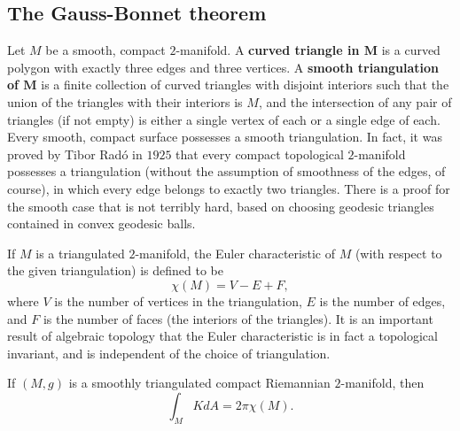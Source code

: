 \subsection{The Gauss-Bonnet theorem}
Let $M$ be a smooth, compact $2$-manifold. A \textbf{curved triangle in $\bm{M}$} is a curved polygon with exactly three edges and three vertices. A 
\textbf{smooth triangulation of $\bm{M}$} is a finite collection of curved triangles with disjoint interiors such that the union of the triangles with their interiors is 
$M$, and the intersection of any pair of triangles (if not empty) is either a single vertex of each or a single edge of each. Every smooth, compact surface possesses a 
smooth triangulation. In fact, it was proved by Tibor Rad\'o in $1925$ that every compact topological $2$-manifold possesses a triangulation (without the assumption of 
smoothness of the edges, of course), in which every edge belongs to exactly two triangles. There is a proof for the smooth case that is not terribly hard, based on 
choosing geodesic triangles contained in convex geodesic balls.\par
If $M$ is a triangulated $2$-manifold, the Euler characteristic of $M$ (with respect to the given triangulation) is defined to be 
\[\chi(M)=V-E+F,\]
where $V$ is the number of vertices in the triangulation, $E$ is the number of edges, and $F$ is the number of faces (the interiors of the triangles). It is an important 
result of algebraic topology that the Euler characteristic is in fact a topological invariant, and is independent of the choice of triangulation.
\begin{theorem}
If $(M,g)$ is a smoothly triangulated compact Riemannian $2$-manifold, then
\[\int_MKdA=2\pi\chi(M).\]
\end{theorem}
